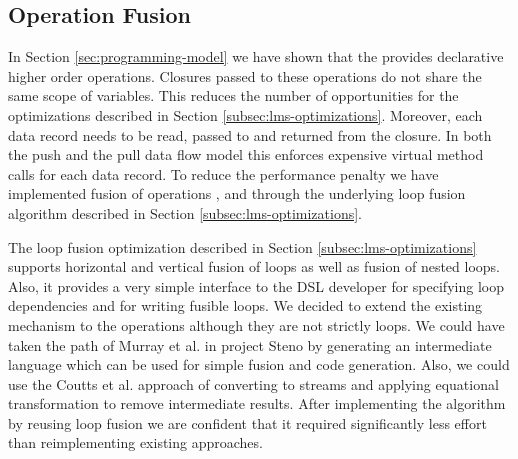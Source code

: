 \subsection{Operation Fusion}
\label{sec:fusion}

In Section \ref{sec:programming-model} we have shown that the  provides declarative higher order operations. Closures passed to these operations do not share the same scope of variables. This reduces the number of opportunities for the optimizations described in Section \ref{subsec:lms-optimizations}. Moreover, each data record needs to be read, passed to and returned from the closure. In both the push and the pull data flow model this enforces expensive virtual method calls \cite{murray_steno:_2011} for each data record. To reduce the performance penalty we have implemented fusion of operations ,  and  through the underlying loop fusion algorithm described in Section \ref{subsec:lms-optimizations}. 

The loop fusion optimization described in Section \ref{subsec:lms-optimizations} supports horizontal and vertical fusion of loops as well as fusion of nested loops. Also, it provides a very simple interface to the DSL developer for specifying loop dependencies and for writing fusible loops. We decided to extend the existing mechanism to the  operations although they are not strictly loops. We could have taken the path of Murray et al. in project Steno \cite{murray_steno:_2011} by generating an intermediate language which can be used for simple fusion and code generation. Also, we could use the Coutts et al. \cite{coutts_stream_2007} approach of converting  to streams and applying equational transformation to remove intermediate results. After implementing the algorithm by reusing loop fusion we are confident that it required significantly less effort than reimplementing existing approaches.

